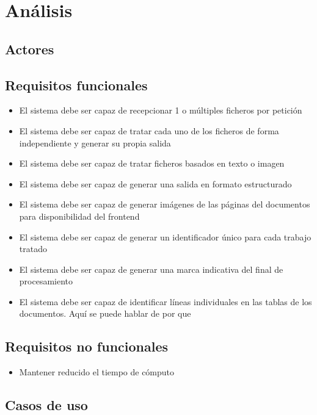
\chapter{Análisis}
\label{chap:analisis}

\section{Actores}

\section{Requisitos funcionales}

\begin{itemize}
\item El sistema debe ser capaz de recepcionar 1 o múltiples ficheros por petición
\item El sistema debe ser capaz de tratar cada uno de los ficheros de forma independiente y generar su propia salida
\item El sistema debe ser capaz de tratar ficheros basados en texto o imagen
\item El sistema debe ser capaz de generar una salida en formato estructurado
\item El sistema debe ser capaz de generar imágenes de las páginas del documentos para disponibilidad del frontend
\item El sistema debe ser capaz de generar un identificador único para cada trabajo tratado
\item El sistema debe ser capaz de generar una marca indicativa del final de procesamiento
\item El sistema debe ser capaz de identificar líneas individuales en las tablas de los documentos. Aquí se puede hablar de por que
\end{itemize}

\section{Requisitos no funcionales}

\begin{itemize}
\item Mantener reducido el tiempo de cómputo    
\end{itemize}

\section{Casos de uso}

